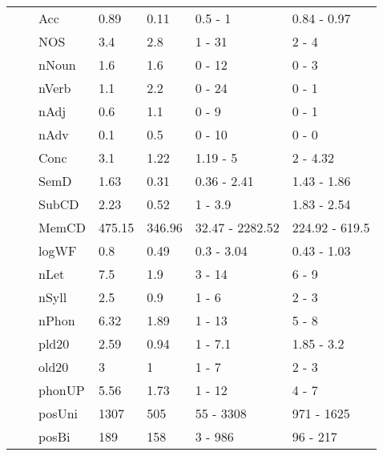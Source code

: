 \begin{table}[ht]
\begin{tabular}{lllllll}
   &  & Acc & 0.89 & 0.11 & 0.5 - 1 & 0.84 - 0.97 \\ 
   &  & NOS & 3.4 & 2.8 & 1 - 31 & 2 - 4 \\ 
   &  & nNoun & 1.6 & 1.6 & 0 - 12 & 0 - 3 \\ 
   &  & nVerb & 1.1 & 2.2 & 0 - 24 & 0 - 1 \\ 
   &  & nAdj & 0.6 & 1.1 & 0 - 9 & 0 - 1 \\ 
   &  & nAdv & 0.1 & 0.5 & 0 - 10 & 0 - 0 \\ 
   &  & Conc & 3.1 & 1.22 & 1.19 - 5 & 2 - 4.32 \\ 
   &  & SemD & 1.63 & 0.31 & 0.36 - 2.41 & 1.43 - 1.86 \\ 
   &  & SubCD & 2.23 & 0.52 & 1 - 3.9 & 1.83 - 2.54 \\ 
   &  & MemCD & 475.15 & 346.96 & 32.47 - 2282.52 & 224.92 - 619.5 \\ 
   &  & logWF & 0.8 & 0.49 & 0.3 - 3.04 & 0.43 - 1.03 \\ 
   &  & nLet & 7.5 & 1.9 & 3 - 14 & 6 - 9 \\ 
   &  & nSyll & 2.5 & 0.9 & 1 - 6 & 2 - 3 \\ 
   &  & nPhon & 6.32 & 1.89 & 1 - 13 & 5 - 8 \\ 
   &  & pld20 & 2.59 & 0.94 & 1 - 7.1 & 1.85 - 3.2 \\ 
   &  & old20 & 3 & 1 & 1 - 7 & 2 - 3 \\ 
   &  & phonUP & 5.56 & 1.73 & 1 - 12 & 4 - 7 \\ 
   &  & posUni & 1307 & 505 & 55 - 3308 & 971 - 1625 \\ 
   &  & posBi & 189 & 158 & 3 - 986 & 96 - 217 \\ 
   \hline
\end{tabular}
\endgroup
\end{table}
